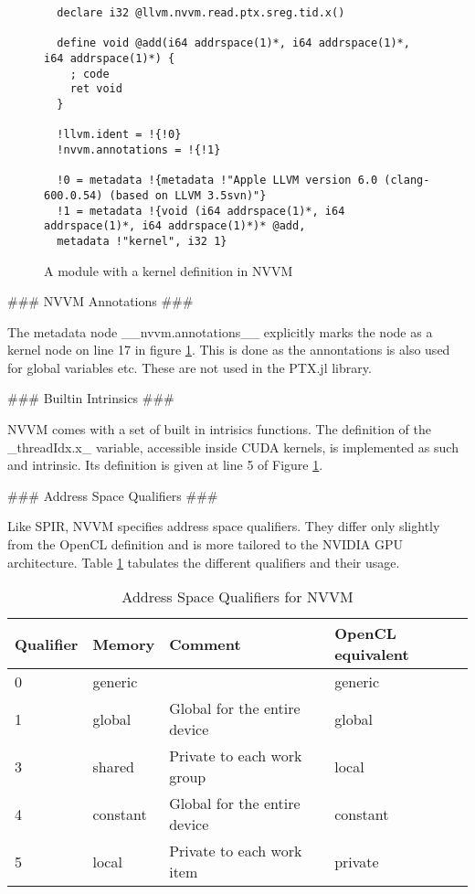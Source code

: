 \begin{markdown}
\begin{figure}[H]
\begin{verbatim}
  declare i32 @llvm.nvvm.read.ptx.sreg.tid.x()
  
  define void @add(i64 addrspace(1)*, i64 addrspace(1)*, i64 addrspace(1)*) {
    ; code
    ret void
  }
  
  !llvm.ident = !{!0}
  !nvvm.annotations = !{!1}
  
  !0 = metadata !{metadata !"Apple LLVM version 6.0 (clang-600.0.54) (based on LLVM 3.5svn)"}
  !1 = metadata !{void (i64 addrspace(1)*, i64 addrspace(1)*, i64 addrspace(1)*)* @add,
  metadata !"kernel", i32 1}
  \end{verbatim}
  \caption{A module with a kernel definition in NVVM}
  \label{fig:nvvm}
\end{figure}

### NVVM Annotations ###

The metadata node __nvvm.annotations__ explicitly marks the node as a
kernel node on line 17 in figure \ref{fig:nvvm}. This is done as the
annontations is also used for global variables etc. These are not used
in the PTX.jl library.

### Builtin Intrinsics ###

\gls{NVVM} comes with a set of built in intrisics functions. The
definition of the _threadIdx.x_ variable, accessible inside \gls{CUDA}
kernels, is implemented as such and intrinsic. Its definition is given
at line 5 of Figure \ref{fig:nvvm}.

### Address Space Qualifiers ###

Like \gls{SPIR}, \gls{NVVM} specifies address space qualifiers. They
differ only slightly from the OpenCL definition and is more tailored
to the NVIDIA GPU architecture. Table \ref{tab:nvvm:addr} tabulates
the different qualifiers and their usage.

\begin{table}[H]
  \centering
  \begin{tabular}{|l|l|l|l|}
    \hline
    Qualifier & Memory   & Comment                      & OpenCL equivalent \\
    \hline
0         & generic  &                   & generic  \\
1         & global   & Global for the entire device & global \\
3         & shared   & Private to each work group   & local \\
4         & constant & Global for the entire device & constant \\
5         & local    & Private to each work item    & private \\
    \hline
  \end{tabular}
  \caption{Address Space Qualifiers for NVVM}
  \label{tab:nvvm:addr}
\end{table}



\end{markdown}
